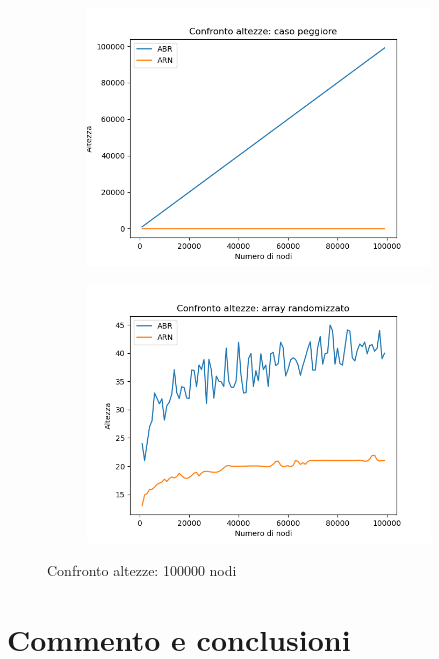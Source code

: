 \documentclass[
]{article}
\begin{document}
\begin{figure}[h!]
	\centering
	\begin{subfigure}[b]{0.4\linewidth}
		\includegraphics[width=\linewidth]{../../img/w_case/h_100000.png}
	\end{subfigure}
	\begin{subfigure}[b]{0.4\linewidth}
		\includegraphics[width=\linewidth]{../../img/rand/h_100000.png}
	\end{subfigure}
	\caption{Confronto altezze: 100000 nodi}
	\label{fig:4}
\end{figure}

\newpage

\hypertarget{commento-e-conclusioni}{%
\section{Commento e conclusioni}\label{commento-e-conclusioni}}
\end{document}
